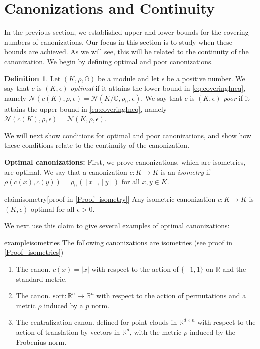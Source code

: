 \documentclass{article}
\theoremstyle{definition}
\newtheorem{definition}{Definition}[section]
\theoremstyle{plain}
\newcommand{\G}{\mathbb{G}}
\newcommand{\N}{\mathcal{N}}
\newcommand{\RR}{\mathbb{R}}
\begin{document}
\section{ Canonizations and Continuity}\label{sec:evaluation}
In the previous section, we established upper and lower bounds for the covering numbers of canonizations. Our focus in this section is to study when these bounds are achieved. As we will see, this will be related to the continuity of the canonization.  We begin by defining optimal and poor canonizations. 
\begin{definition}
Let $(K,\rho,\G)$ be a module and let $\epsilon$ be a positive number. We say that $c$ is $(K,\epsilon) $ \emph{optimal} if it attains the lower bound in \eqref{eq:coveringIneq}, namely 
$
\N(c(K),\rho,\epsilon) = \N(K/\G,\rho_{\G},\epsilon).
$
We say that $c$ is $(K,\epsilon) $ \emph{poor}  if it attains the upper bound in \eqref{eq:coveringIneq}, namely 
$
\N(c(K),\rho,\epsilon)=\N(K,\rho,\epsilon).
$
\end{definition}
We will next show conditions for optimal and poor canonizations, and show how these conditions relate to the continuity of the canonization. 

\textbf{Optimal canonizations:}
First, we prove canonizations, which are isometries, are optimal. We say that a canonization $c:K\to K $ is an \emph{isometry} if $\rho(c(x),c(y))=\rho_{\G}([x],[y])  $ for all $x,y\in K$.
\begin{restatable}{claim}{isometry}\label{claim:isometry}[proof in \ref{Proof_isometry}]
    Any isometric canonization $c:K\to K$ is $(K,\epsilon) $ optimal for all $\epsilon>0$.
\end{restatable}

We next use this claim to give several examples of  optimal canonizations:
\begin{restatable}{example}{isometries}\label{prop:isometries}
    The following canonizations are isometries (see proof in \ref{Proof_isometries})
\begin{enumerate}
\item The canon. $c(x)=|x|$ with respect to the action of $\{-1,1\} $ on $\RR$ and the standard metric.
\item The canon. $\mathrm{sort}:\RR^n \to \RR^n $ with respect to the action of permutations and a metric $\rho$ induced by a $p$ norm.
\item The centralization canon. defined for point clouds in $\RR^{d\times n}$ with respect to the action of translation by vectors in $\RR^d$, with the metric $\rho$ induced by the Frobenius norm.
\end{enumerate}
\end{restatable}
\end{document}

